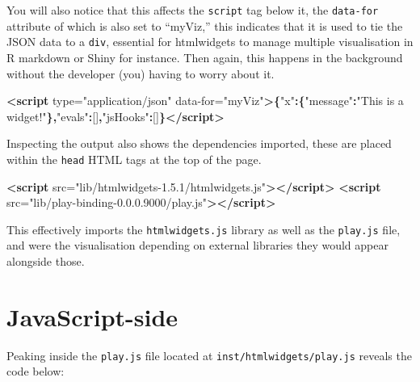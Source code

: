 \documentclass[
]{krantz}
\makeatletter
\newenvironment{Shaded}{\begin{snugshade}}{\end{snugshade}}
\newcommand{\KeywordTok}[1]{\textcolor[rgb]{0.27,0.27,0.27}{\textbf{#1}}}
\newcommand{\NormalTok}[1]{#1}
\newcommand{\OperatorTok}[1]{\textcolor[rgb]{0.43,0.43,0.43}{\textbf{#1}}}
\newcommand{\OtherTok}[1]{\textcolor[rgb]{0.37,0.37,0.37}{#1}}
\newcommand{\StringTok}[1]{\textcolor[rgb]{0.5,0.5,0.5}{#1}}
\newenvironment{kframe}{%
\medskip{}
\setlength{\fboxsep}{.8em}
 \def\at@end@of@kframe{}%
 \ifinner\ifhmode%
  \def\at@end@of@kframe{\end{minipage}}%
  \begin{minipage}{\columnwidth}%
 \fi\fi%
 \def\FrameCommand##1{\hskip\@totalleftmargin \hskip-\fboxsep
 \colorbox{shadecolor}{##1}\hskip-\fboxsep
     \hskip-\linewidth \hskip-\@totalleftmargin \hskip\columnwidth}%
 \MakeFramed {\advance\hsize-\width
   \@totalleftmargin\z@ \linewidth\hsize
   \@setminipage}}%
 {\par\unskip\endMakeFramed%
 \at@end@of@kframe}
\renewenvironment{Shaded}{\begin{kframe}}{\end{kframe}}
\makeatother
\begin{document}
You will also notice that this affects the \texttt{script} tag below it, the \texttt{data-for} attribute of which is also set to ``myViz,'' this indicates that it is used to tie the JSON data to a \texttt{div}, essential for htmlwidgets to manage multiple visualisation in R markdown or Shiny for instance. Then again, this happens in the background without the developer (you) having to worry about it.

\begin{Shaded}
\begin{Highlighting}[]
\KeywordTok{<script}\OtherTok{ type=}\StringTok{"application/json"}\OtherTok{ data{-}for=}\StringTok{"myViz"}\KeywordTok{>}\OperatorTok{\{}\StringTok{"x"}\OperatorTok{:\{}\StringTok{"message"}\OperatorTok{:}\StringTok{"This is a widget!"}\OperatorTok{\},}\StringTok{"evals"}\OperatorTok{:}\NormalTok{[]}\OperatorTok{,}\StringTok{"jsHooks"}\OperatorTok{:}\NormalTok{[]}\OperatorTok{\}}\KeywordTok{</script>}
\end{Highlighting}
\end{Shaded}

Inspecting the output also shows the dependencies imported, these are placed within the \texttt{head} HTML tags at the top of the page.

\begin{Shaded}
\begin{Highlighting}[]
\KeywordTok{<script}\OtherTok{ src=}\StringTok{"lib/htmlwidgets{-}1.5.1/htmlwidgets.js"}\KeywordTok{></script>}
\KeywordTok{<script}\OtherTok{ src=}\StringTok{"lib/play{-}binding{-}0.0.0.9000/play.js"}\KeywordTok{></script>}
\end{Highlighting}
\end{Shaded}

This effectively imports the \texttt{htmlwidgets.js} library as well as the \texttt{play.js} file, and were the visualisation depending on external libraries they would appear alongside those.

\hypertarget{javascript-side}{%
\section{JavaScript-side}\label{javascript-side}}

Peaking inside the \texttt{play.js} file located at \texttt{inst/htmlwidgets/play.js} reveals the code below:
\end{document}
